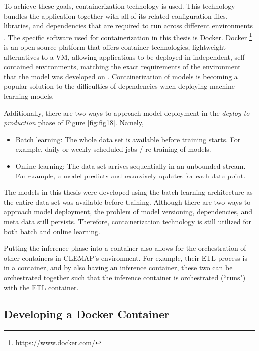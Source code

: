 To achieve these goals, containerization technology is used. This technology bundles the application together with all of its related configuration files, libraries, and dependencies that are required to run across different environments \cite{dreyfus-schmidt_introducing_2020}. The specific software used for containerization in this thesis is Docker. Docker \footnote[3]{https://www.docker.com/} is an open source platform that offers container technologies, lightweight alternatives to a \ac{VM}, allowing applications to be deployed in independent, self-contained environments, matching the exact requirements of the environment that the model was developed on \cite{dreyfus-schmidt_introducing_2020}. Containerization of models is becoming a popular solution to the difficulties of dependencies when deploying machine learning models. 

Additionally, there are two ways to approach model deployment in the \textit{deploy to production} phase of Figure \ref{fig:fig18}. Namely,

\begin{itemize}
    \item Batch learning: The whole data set is available before training starts. For example, daily or weekly scheduled jobs / re-training of models.
    \item Online learning: The data set arrives sequentially in an unbounded stream. For example, a model predicts and recursively updates for each data point.
\end{itemize}

The models in this thesis were developed using the batch learning architecture as the entire data set was available before training. Although there are two ways to approach model deployment, the problem of model versioning, dependencies, and meta data still persists. Therefore, containerization technology is still utilized for both batch and online learning. 

Putting the inference phase into a container also allows for the orchestration of other containers in CLEMAP's environment. For example, their \ac{ETL} process is in a container, and by also having an inference container, these two can be orchestrated together such that the inference container is orchestrated (``runs") with the ETL container. 

\subsection{Developing a Docker Container}

